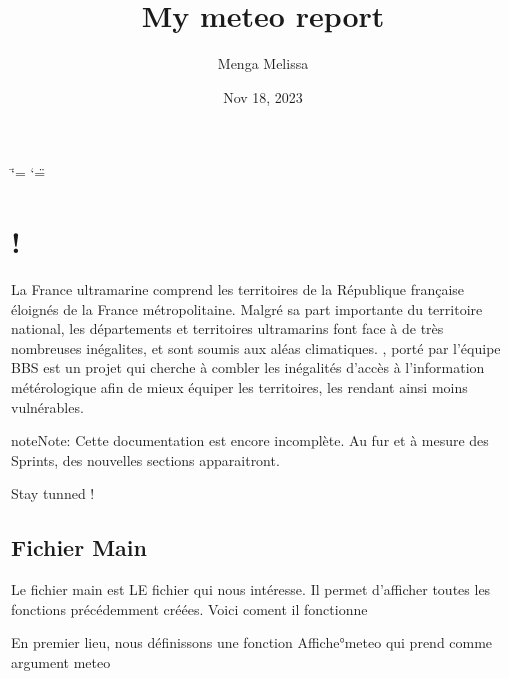 \documentclass[letterpaper,10pt,english]{sphinxmanual}
\title{My meteo report}
\date{Nov 18, 2023}
\author{Menga Melissa}
\begin{document}
\ifdefined\shorthandoff
  \ifnum\catcode`\=\string=\active\shorthandoff{=}\fi
  \ifnum\catcode`\"=\active{}\fi
\fi

\pagestyle{empty}
\sphinxmaketitle
\pagestyle{plain}
\sphinxtableofcontents
\pagestyle{normal}
\label{\detokenize{index::doc}}



\chapter{!}
\label{\detokenize{index:my-meteo-report}}
\sphinxAtStartPar
La France ultramarine comprend les territoires de la République française éloignés de la France métropolitaine.
Malgré sa part importante du territoire national, les départements et territoires ultramarins font face à de très nombreuses inégalites, et sont soumis aux aléas climatiques.
, porté par l’équipe BBS est un projet qui cherche à combler les inégalités d’accès à l’information métérologique afin de mieux équiper les territoires, les rendant ainsi moins vulnérables.

\begin{sphinxadmonition}{note}{Note:}
\sphinxAtStartPar
Cette documentation est encore incomplète. Au fur et à mesure des Sprints, des nouvelles sections apparaitront.

\sphinxAtStartPar
{}

\sphinxAtStartPar
Stay tunned !
\end{sphinxadmonition}

\sphinxstepscope


\section{Fichier Main}
\label{\detokenize{main:fichier-main}}\label{\detokenize{main::doc}}
\sphinxAtStartPar
Le fichier main est LE fichier qui nous intéresse. Il permet d’afficher toutes les fonctions précédemment créées. Voici coment il fonctionne

\sphinxAtStartPar
En premier lieu, nous définissons une fonction Affiche°meteo qui prend comme argument meteo

\begin{sphinxVerbatim}[commandchars=\\\{\}]
 
\end{sphinxVerbatim}
\end{document}
